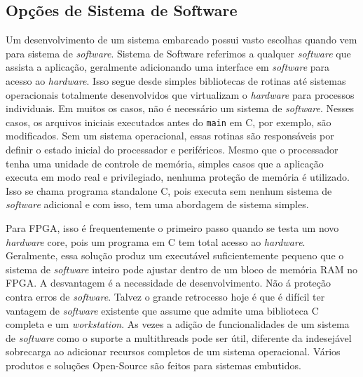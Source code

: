 \subsection{Opções de Sistema de Software}

Um desenvolvimento de um sistema embarcado possui vasto escolhas quando vem para sistema de \textit{software}. Sistema de Software referimos a qualquer \textit{software} que assista a aplicação, geralmente adicionando uma interface em \textit{software} para acesso ao \textit{hardware}. Isso segue desde simples bibliotecas de rotinas até sistemas operacionais totalmente desenvolvidos que virtualizam o \textit{hardware} para processos individuais. Em muitos os casos, não é necessário um sistema de \textit{software}. Nesses casos, os arquivos iniciais executados antes do \texttt{main} em C, por exemplo, são modificados. Sem um sistema operacional, essas rotinas são responsáveis por definir o estado inicial do processador e periféricos. Mesmo que o processador tenha uma unidade de controle de memória,  simples casos que a aplicação executa em modo real e privilegiado, nenhuma proteção de memória é utilizado. Isso se chama programa standalone C, pois executa sem nenhum sistema de \textit{software} adicional e com isso, tem uma abordagem de sistema simples.

Para FPGA, isso é frequentemente o primeiro passo quando se testa um novo \textit{hardware} core, pois um programa em C tem total acesso ao \textit{hardware}. Geralmente, essa solução produz um executável suficientemente pequeno que o sistema de \textit{software} inteiro pode ajustar dentro de um bloco de memória RAM no FPGA. A desvantagem é a necessidade de desenvolvimento. Não á proteção contra erros de \textit{software}. Talvez o grande retrocesso hoje é que é difícil ter vantagem de \textit{software} existente que assume que admite uma biblioteca C completa e um \textit{workstation}. As vezes a adição de funcionalidades de um sistema de \textit{software} como o suporte a multithreads pode ser útil, diferente da indesejável sobrecarga ao adicionar recursos completos de um sistema operacional. Vários produtos e soluções Open-Source são feitos para sistemas embutidos.

